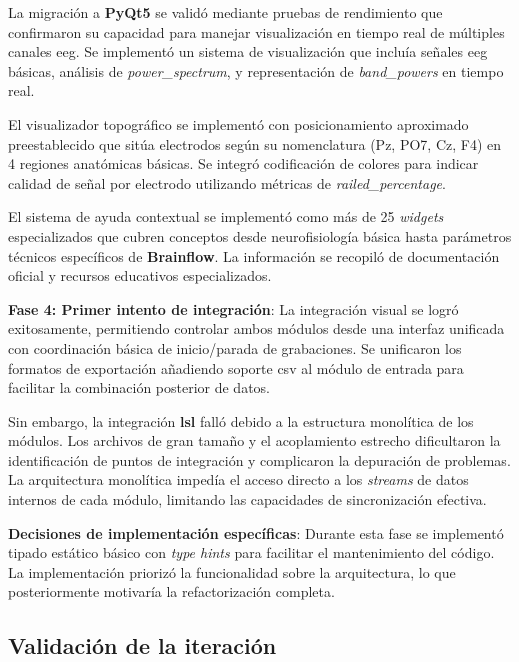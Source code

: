 La migración a \textbf{PyQt5} se validó mediante pruebas de rendimiento que confirmaron su capacidad para manejar visualización en tiempo real de múltiples canales \acrshort{eeg}. Se implementó un sistema de visualización que incluía señales \acrshort{eeg} básicas, análisis de \textit{\gls{power_spectrum}}, y representación de \textit{\gls{band_powers}} en tiempo real.

El visualizador topográfico se implementó con posicionamiento aproximado preestablecido que sitúa electrodos según su nomenclatura (Pz, PO7, Cz, F4) en 4 regiones anatómicas básicas. Se integró codificación de colores para indicar calidad de señal por electrodo utilizando métricas de \textit{\gls{railed_percentage}}.

El sistema de ayuda contextual se implementó como más de 25 \textit{\glspl{widget}} especializados que cubren conceptos desde neurofisiología básica hasta parámetros técnicos específicos de \textbf{Brainflow}. La información se recopiló de documentación oficial y recursos educativos especializados.

\textbf{Fase 4: Primer intento de integración}:
La integración visual se logró exitosamente, permitiendo controlar ambos módulos desde una interfaz unificada con coordinación básica de inicio/parada de grabaciones. Se unificaron los formatos de exportación añadiendo soporte \acrshort{csv} al módulo de entrada para facilitar la combinación posterior de datos.

Sin embargo, la integración \textbf{\acrshort{lsl}} falló debido a la estructura monolítica de los módulos. Los archivos de gran tamaño y el acoplamiento estrecho dificultaron la identificación de puntos de integración y complicaron la depuración de problemas. La arquitectura monolítica impedía el acceso directo a los \textit{\glspl{stream}} de datos internos de cada módulo, limitando las capacidades de sincronización efectiva.

\textbf{Decisiones de implementación específicas}:
Durante esta fase se implementó tipado estático básico con \textit{\gls{type hints}} para facilitar el mantenimiento del código. La implementación priorizó la funcionalidad sobre la arquitectura, lo que posteriormente motivaría la refactorización completa.

\subsection{Validación de la iteración}
\label{subsec:validacion_iteracion_1}

